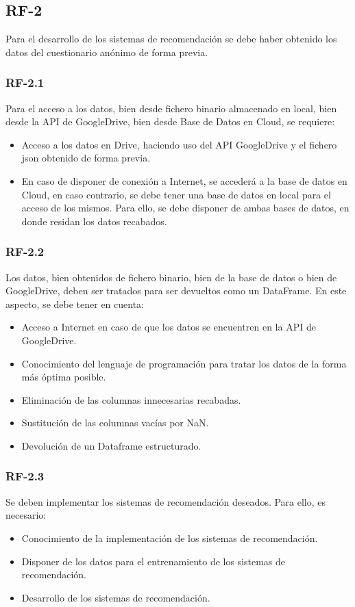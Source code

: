 \subsection{RF-2}
Para el desarrollo de los sistemas  de recomendación se debe haber obtenido los datos del cuestionario anónimo de forma previa. 
\subsubsection{RF-2.1}
Para el acceso a los datos, bien  desde fichero binario almacenado en local, bien desde la API de GoogleDrive, bien desde Base de Datos en Cloud, se requiere: 
\begin{itemize}
\item Acceso a los datos en Drive, haciendo uso del API GoogleDrive y el fichero json obtenido de forma previa. 
\item En caso de disponer de conexión a Internet, se accederá a la base de datos en Cloud, en caso contrario, se debe tener una base de datos en local para el acceso de los mismos. Para ello, se debe disponer de ambas bases de datos, en donde residan  los datos recabados. 
\end{itemize}

\subsubsection{RF-2.2}
Los datos, bien obtenidos de fichero binario, bien de la base de datos o bien de GoogleDrive, deben ser tratados para ser devueltos como un DataFrame. En este aspecto, se debe tener en cuenta: 
\begin{itemize}
\item Acceso a Internet en caso de que los datos se encuentren en la API de GoogleDrive. 
\item Conocimiento del lenguaje de programación para tratar los datos de la forma más óptima posible. 
\item Eliminación de las columnas innecesarias recabadas. 
\item Sustitución de las columnas vacías por NaN. 
\item Devolución de un Dataframe estructurado. 
\end{itemize}

\subsubsection{RF-2.3}
Se deben implementar los sistemas de recomendación deseados. Para ello, es necesario: 
\begin{itemize}
\item Conocimiento de la implementación de los sistemas de recomendación. 
\item Disponer de los datos para el entrenamiento de los sistemas de recomendación. 
\item Desarrollo de los sistemas de recomendación.
\end{itemize}


